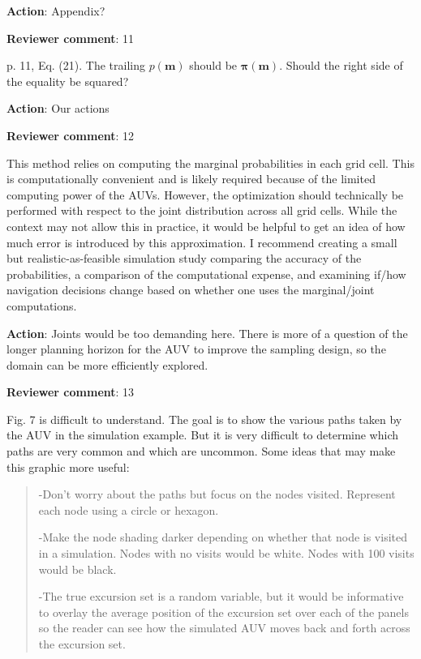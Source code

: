 \documentclass[a4paper]{article}
\newcommand{\bm}{ {\boldsymbol m} }
\newcommand{\bpi}{ {\boldsymbol \pi} }
\def\revcom{\textbf{Reviewer comment}}
\def\action{\textbf{Action}}
\begin{document}
\begin{answers}
\action: Appendix? 

\item{\revcom:  11}\label{r2c11}

p. 11, Eq. (21). The trailing $p(\bm)$ should be $\bpi(\bm)$. Should the right side of the equality be squared? 

\action: Our actions

\item{\revcom:  12}\label{r2c12}

This method relies on computing the marginal probabilities in each grid cell. This is computationally convenient and is likely required because of the limited computing power of the AUVs. However, the optimization should technically be performed with respect to the joint distribution across all grid cells. While the context may not allow this in practice, it would be helpful to get an idea of how much error is introduced by this approximation. I recommend creating a small but realistic-as-feasible simulation study comparing the accuracy of the probabilities, a comparison of the computational expense, and examining if/how navigation decisions change based on whether one uses the marginal/joint computations. 

\action: Joints would be too demanding here. There is more of a question of the longer planning horizon for the AUV to improve the sampling design, so the domain can be more efficiently explored. 

\item{\revcom:  13}\label{r2c13}

Fig. 7 is difficult to understand. The goal is to show the various paths taken by the AUV in the
simulation example. But it is very difficult to determine which paths are very common and which
are uncommon. Some ideas that may make this graphic more useful:

\begin{quote}
-Don’t worry about the paths but focus on the nodes visited. Represent each node using a circle or hexagon.\par
-Make the node shading darker depending on whether that node is visited in a
simulation. Nodes with no visits would be white. Nodes with 100 visits would be black.\par
-The true excursion set is a random variable, but it would be informative to overlay the
average position of the excursion set over each of the panels so the reader can see how
the simulated AUV moves back and forth across the excursion set.
\end{quote}


\end{answers}
\end{document}
